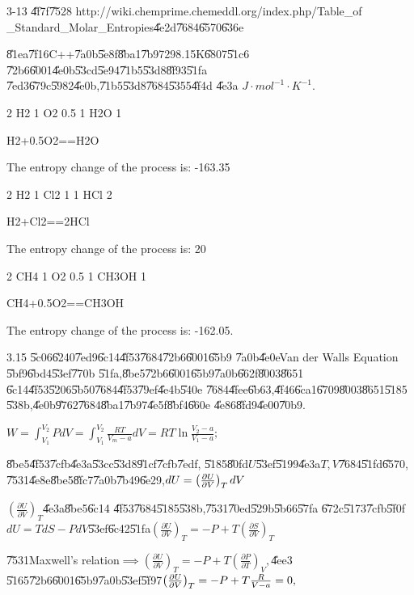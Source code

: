 \documentclass{article}
\begin{document}
3-13 \U{4f7f}\U{7528} http://wiki.chemprime.chemeddl.org/index.php/Table\_of%
\_Standard\_Molar\_Entropies\U{4e2d}\U{7684}\U{6570}\U{636e}

\U{81ea}\U{7f16}C++\U{7a0b}\U{5e8f}\U{8ba1}\U{7b97}298.15K\U{6807}\U{51c6}%
\U{72b6}\U{6001}\U{4e0b}\U{53cd}\U{5e94}\U{71b5}\U{53d8}\U{8f93}\U{51fa}%
\U{7ed3}\U{679c}\U{5982}\U{4e0b},\U{71b5}\U{53d8}\U{7684}\U{5355}\U{4f4d}%
\U{4e3a} $\unit{J}\cdot \unit{mol}^{-1}\cdot \unit{K}^{-1}.$

2 H2 1 O2 0.5 1 H2O 1

H2+0.5O2==H2O

The entropy change of the process is: -163.35

2 H2 1 Cl2 1 1 HCl 2

H2+Cl2==2HCl

The entropy change of the process is: 20

2 CH4 1 O2 0.5 1 CH3OH 1

CH4+0.5O2==CH3OH

The entropy change of the process is: -162.05.

3.15 \U{5c06}\U{6240}\U{7ed9}\U{6c14}\U{4f53}\U{7684}\U{72b6}\U{6001}\U{65b9}%
\U{7a0b}\U{4e0e}Van der Walls Equation \U{5bf9}\U{6bd4}\U{53ef}\U{770b}%
\U{51fa},\U{8be5}\U{72b6}\U{6001}\U{65b9}\U{7a0b}\U{662f}\U{8003}\U{8651}%
\U{6c14}\U{4f53}\U{5206}\U{5b50}\U{7684}\U{4f53}\U{79ef}\U{4e4b}\U{540e}%
\U{7684}\U{4fee}\U{6b63},\U{4f46}\U{6ca1}\U{6709}\U{8003}\U{8651}\U{5185}%
\U{538b},\U{4e0b}\U{9762}\U{7684}\U{8ba1}\U{7b97}\U{4e5f}\U{8bf4}\U{660e}%
\U{4e86}\U{8fd9}\U{4e00}\U{70b9}.

$W=\int_{V_{1}}^{V_{2}}PdV=\int_{V_{1}}^{V_{2}}\frac{RT}{V_{m}-a}dV=RT\ln 
\frac{V_{2}-a}{V_{1}-a};$

\U{8be5}\U{4f53}\U{7cfb}\U{4e3a}\U{53cc}\U{53d8}\U{91cf}\U{7cfb}\U{7edf},%
\U{5185}\U{80fd}$U$\U{53ef}\U{5199}\U{4e3a}$T,V$\U{7684}\U{51fd}\U{6570},%
\U{7531}\U{4e8e}\U{8be5}\U{8fc7}\U{7a0b}\U{7b49}\U{6e29},$dU=\left( \frac{%
\partial U}{\partial V}\right) _{T}dV$

$\left( \frac{\partial U}{\partial V}\right) _{T}$\U{4e3a}\U{8be5}\U{6c14}%
\U{4f53}\U{7684}\U{5185}\U{538b},\U{7531}\U{70ed}\U{529b}\U{5b66}\U{57fa}%
\U{672c}\U{5173}\U{7cfb}\U{5f0f}\qquad $dU=TdS-PdV$\U{53ef}\U{6c42}\U{51fa}$%
\left( \frac{\partial U}{\partial V}\right) _{T}=-P+T\left( \frac{\partial S%
}{\partial V}\right) _{T}$

\U{7531}Maxwell's relation$\implies \left( \frac{\partial U}{\partial V}%
\right) _{T}=-P+T\left( \frac{\partial P}{\partial T}\right) _{V},$\U{4ee3}%
\U{5165}\U{72b6}\U{6001}\U{65b9}\U{7a0b}\U{53ef}\U{5f97}$\left( \frac{%
\partial U}{\partial V}\right) _{T}=-P+T\frac{R}{V-a}=0,$
\end{document}
